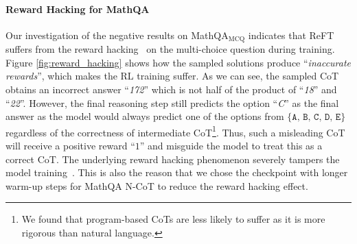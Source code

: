 \begin{table}[t!]
    \centering
\caption{Value accuracy of ReFT and the baselines with two foundation models on MathQA$_\text{numeric}$ benchmark}
\label{tab:mathqa_numeric}
\end{table}

\paragraph{Reward Hacking for MathQA}
Our investigation of the negative results on MathQA$_\text{MCQ}$ indicates that ReFT suffers from the reward hacking~\cite{skalse2022defining} on the multi-choice question during training. 
Figure \ref{fig:reward_hacking} shows how the sampled solutions produce ``\textit{inaccurate rewards}'', which makes the RL training suffer. 
As we can see, the sampled CoT obtains an incorrect answer ``\textit{172}'' which is not half of the product of ``\textit{18}'' and ``\textit{22}''.
However, the final reasoning step still predicts the option ``\textit{C}'' as the final answer as the model would always predict one of the options from $\{\texttt{A, B, C, D, E}\}$ regardless of the correctness of intermediate CoT\footnote{We found that program-based CoTs are less likely to suffer as it is more rigorous than natural language.}. 
Thus, such a misleading CoT will receive a positive reward ``$1$'' and misguide the model to treat this as a correct CoT. 
The underlying reward hacking phenomenon severely tampers the model training~\cite{everitt2021reward}. 
This is also the reason that we chose the checkpoint with longer warm-up steps for MathQA N-CoT to reduce the reward hacking effect.

